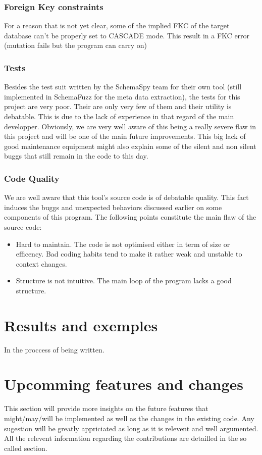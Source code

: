 \documentclass{article}
\begin{document}
\begin{empfile}
			\subsubsection{Foreign Key constraints}			
For a reason that is not yet clear, some of the implied FKC of the target database can't be properly set to CASCADE mode. This result in a FKC error (mutation fails but the program can carry on)			
			\subsubsection{Tests}
Besides the test suit written by the SchemaSpy team for their own tool (still implemented in SchemaFuzz for the meta data extraction), the tests for this project are very poor. Their are only very few of them and their utility is debatable. This is due to the lack of experience in that regard of the main developper. Obviously, we are very well aware of this being a really severe flaw in this project and will be one of the main future improvements.
This big lack of good maintenance equipment might also explain some of the silent and non silent buggs that still remain in the code to this day.

			\subsubsection{Code Quality}
We are well aware that this tool's source code is of debatable quality. This fact induces the  buggs and unexpected behaviors discussed earlier on some components of this program. 
The following points constitute the main flaw of the source code:
			\begin{itemize}
			\item Hard to maintain. The code is not optimised either in term of size or 			efficency. Bad coding habits tend to make it rather weak and unstable to context changes.
			\item Structure is not intuitive. The main loop of the program lacks a good 		structure.
			\end{itemize}

	\section{Results and exemples}
In the proccess of being written.

	\section{Upcomming features and changes}
This section will provide more insights on the future features that might/may/will be implemented as well as the changes in the existing code.
Any sugestion will be greatly appriciated as long as it is relevent and well argumented. All the relevent information regarding the contributions are detailled in the so called section.


\end{empfile}
\end{document}
